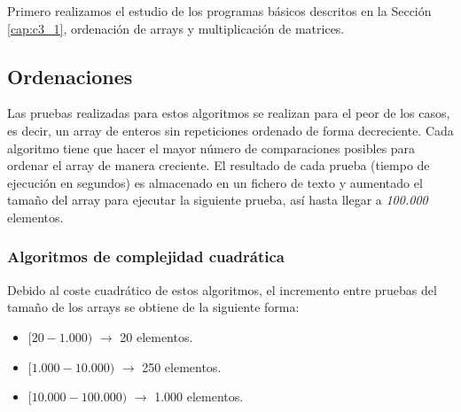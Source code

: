 Primero realizamos el estudio de los programas básicos descritos en la Sección \ref{cap:c3_1}, ordenación de arrays y multiplicación de matrices.

	\subsection{Ordenaciones}
	
	Las pruebas realizadas para estos algoritmos se realizan para el peor de los casos, es decir, un array de enteros sin repeticiones ordenado de forma decreciente. Cada algoritmo tiene que hacer el mayor número de comparaciones posibles para ordenar el array de manera creciente. El resultado de cada prueba (tiempo de ejecución en segundos) es almacenado en un fichero de texto y aumentado el tamaño del array para ejecutar la siguiente prueba, así hasta llegar a \textit{100.000} elementos.	
	
		\subsubsection{Algoritmos de complejidad cuadrática}		
		\label{cap:4_2_1_1}
		
		Debido al coste cuadrático de estos algoritmos, el incremento entre pruebas del tamaño de los arrays se obtiene de la siguiente forma:
		\begin{itemize}
			\vspace*{-0.2cm}	
			\item \([20-1.000)\) $\rightarrow$ 20 elementos.
			\vspace*{-0.4cm}	
			\item \([1.000-10.000)\) $\rightarrow$ 250 elementos.
			\vspace*{-0.4cm}	
			\item \([10.000-100.000)\) $\rightarrow$ 1.000 elementos.					
		\end{itemize}
		
		
		
